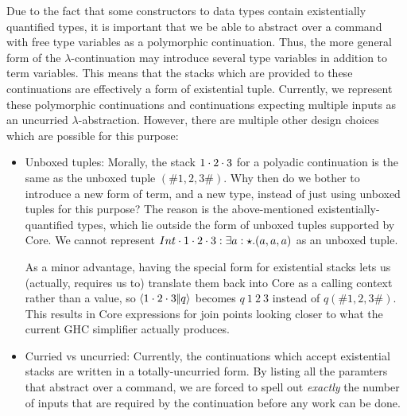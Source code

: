 \documentclass{article}
\begin{document}
Due to the fact that some constructors to data types contain existentially
quantified types, it is important that we be able to abstract over a command
with free type variables as a polymorphic continuation.  Thus, the more general
form of the $\lambda$-continuation may introduce several type variables in
addition to term variables.  This means that the stacks which are provided to
these continuations are effectively a form of existential tuple.  Currently, we
represent these polymorphic continuations and continuations expecting multiple
inputs as an uncurried $\lambda$-abstraction.  However, there are multiple other
design choices which are possible for this purpose:
\begin{itemize}
\item Unboxed tuples: Morally, the stack ${1}\cdot{{2}\cdot{3}}$ for a polyadic
  continuation is the same as the unboxed tuple $(\# 1, 2, 3 \#)$.  Why then do
  we bother to introduce a new form of term, and a new type, instead of just
  using unboxed tuples for this purpose?  The reason is the above-mentioned
  existentially-quantified types, which lie outside the form of unboxed tuples
  supported by Core.  We cannot represent
  ${Int}\cdot{{1}\cdot{{2}\cdot{3}}} : \exists{a:\star}.({a, a, a})$ as an unboxed
  tuple.

  As a minor advantage, having the special form for existential stacks lets us
  (actually, requires us to) translate them back into Core as a calling context
  rather than a value, so $\left\langle{{1}\cdot{{2}\cdot{3}}}\middle|\!\middle|{q}\right\rangle$ becomes $q ~ 1 ~ 2 ~ 3$
  instead of $q (\# 1, 2, 3 \#)$.  This results in Core expressions for join
  points looking closer to what the current GHC simplifier actually produces.

\item Curried vs uncurried: Currently, the continuations which accept
  existential stacks are written in a totally-uncurried form.  By listing all
  the paramters that abstract over a command, we are forced to spell out
  \emph{exactly} the number of inputs that are required by the continuation
  before any work can be done.


\end{itemize}
\end{document}

